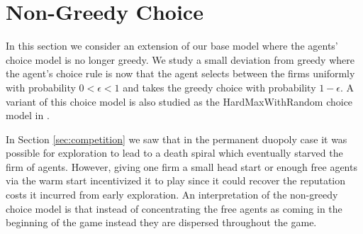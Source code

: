 \documentclass[../competing_bandits.tex]{subfiles}
\begin{document}
\section{Non-Greedy Choice}\label{section:non_greedy}

In this section we consider an extension of our base model where the agents' choice model is no longer greedy. We study a small deviation from greedy where the agent's choice rule is now that the agent selects between the firms uniformly with probability $0 < \epsilon < 1$ and takes the greedy choice with probability $1 - \epsilon$. A variant of this choice model is also studied as the HardMaxWithRandom choice model in \cite{mansour2018competing}.

In Section \ref{sec:competition} we saw that in the permanent duopoly case it was possible for exploration to lead to a death spiral which eventually starved the firm of agents. However, giving one firm a small head start or enough free agents via the warm start incentivized it to play \TS since it could recover the reputation costs it incurred from early exploration. An interpretation of the non-greedy choice model is that instead of concentrating the free agents as coming in the beginning of the game instead they are dispersed throughout the game.
\end{document}
